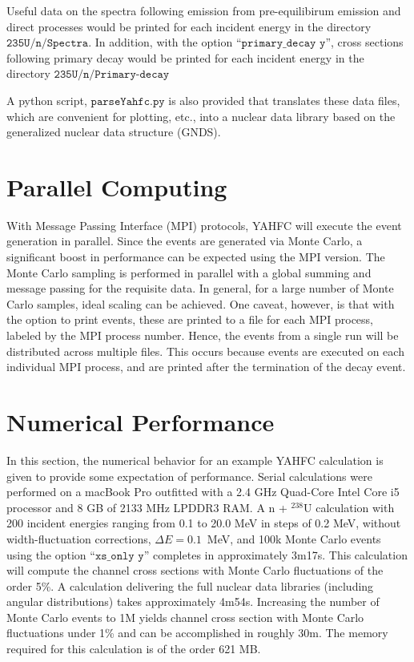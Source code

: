 \documentclass[
10pt,
showpacs,preprintnumbers,footinbib,
amsfonts,amsmath,amssymb,
aps,
prc,twocolumn,groupedaddress,superscriptaddress,
showkeys,
nofootinbib
]{revtex4-1}
\begin{document}
Useful data on the spectra following emission from pre-equilibirum emission and direct processes would be printed for each incident energy in the directory ${\texttt{235U/n/Spectra}}$. In addition, with the option ``${\texttt{primary\_decay y}}$'', cross sections following primary decay would be printed for each incident energy in the directory ${\texttt{235U/n/Primary-decay}}$

A python script, ${\texttt{parseYahfc.py}}$ is also provided that translates these data files, which are convenient for plotting, etc., into a nuclear data library based on the generalized nuclear data structure (GNDS).

\section{Parallel Computing}

With Message Passing Interface (MPI) protocols, YAHFC will execute the event generation in parallel. Since the events are generated via Monte Carlo, a significant boost in performance can be expected using the MPI version. The Monte Carlo sampling is performed in parallel with a global summing and message passing for the requisite data. In general, for a large number of Monte Carlo samples, ideal scaling can be achieved. One caveat, however, is that with the option to print events, these are printed to a file for each MPI process, labeled by the MPI process number. Hence, the events from a single run will be distributed across multiple files. This occurs because events are executed on each individual MPI process, and are printed after the termination of the decay event. 

\section{Numerical Performance}
In this section, the numerical behavior for an example YAHFC calculation is given to provide some expectation of performance. Serial calculations were performed on a macBook Pro outfitted with a 2.4 GHz Quad-Core Intel Core i5 processor and 8 GB of 2133 MHz LPDDR3 RAM. A n + $^{238}$U calculation with 200 incident energies ranging from 0.1 to 20.0 MeV in steps of 0.2 MeV, without width-fluctuation corrections, $\Delta E = 0.1$~MeV, and 100k Monte Carlo events using the option ``${\texttt{xs\_only y}}$'' completes in approximately 3m17s. This calculation will compute the channel cross sections with Monte Carlo fluctuations of the order 5\%. A calculation delivering the full nuclear data libraries (including angular distributions) takes approximately 4m54s. Increasing the number of Monte Carlo events to 1M yields channel cross section with Monte Carlo fluctuations under 1\% and can be accomplished in roughly 30m. The memory required for this calculation is of the order 621 MB.
\end{document}
